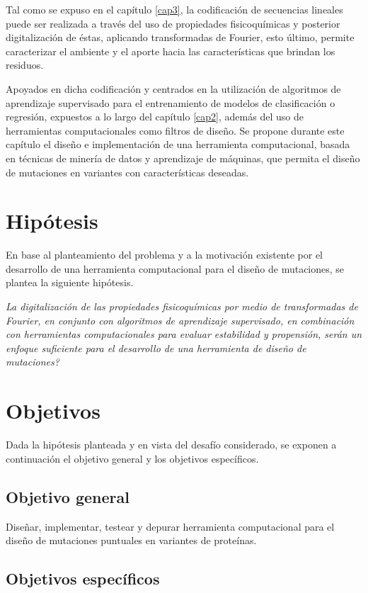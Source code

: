 Tal como se expuso en el capítulo \ref{cap3}, la codificación de secuencias lineales puede ser realizada a través del uso de propiedades fisicoquímicas y posterior digitalización de éstas, aplicando transformadas de Fourier, esto último, permite caracterizar el ambiente y el aporte hacia las características que brindan los residuos. 

Apoyados en dicha codificación y centrados en la utilización de algoritmos de aprendizaje supervisado para el entrenamiento de modelos de clasificación o regresión, expuestos a lo largo del capítulo \ref{cap2}, además del uso de herramientas computacionales como filtros de diseño. Se propone durante este capítulo el diseño e implementación de una herramienta computacional, basada en técnicas de minería de datos y aprendizaje de máquinas, que permita el diseño de mutaciones en variantes con características deseadas.

\section{Hipótesis}

En base al planteamiento del problema y a la motivación existente por el desarrollo de una herramienta computacional para el diseño de mutaciones, se plantea la siguiente hipótesis.

\textit{La digitalización de las propiedades fisicoquímicas por medio de transformadas de Fourier, en conjunto con algoritmos de aprendizaje supervisado, en combinación con herramientas computacionales para evaluar estabilidad y propensión, serán un enfoque suficiente para el desarrollo de una herramienta de diseño de mutaciones?}

\section{Objetivos}

Dada la hipótesis planteada y en vista del desafío considerado, se exponen a continuación el objetivo general y los objetivos específicos.

\subsection{Objetivo general}

Diseñar, implementar, testear y depurar herramienta computacional para el diseño de mutaciones puntuales en variantes de proteínas.

\subsection{Objetivos específicos}

